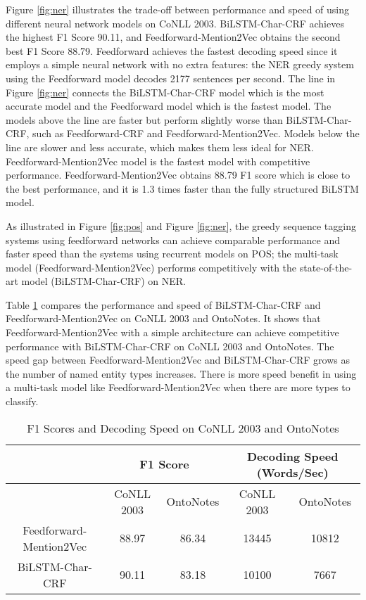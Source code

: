 Figure \ref{fig:ner} illustrates the trade-off between performance and speed of using different neural network models on CoNLL 2003. BiLSTM-Char-CRF achieves the highest F1 Score 90.11, and Feedforward-Mention2Vec obtains the second best F1 Score 88.79. Feedforward achieves the fastest decoding speed since it employs a simple neural network with no extra features: the NER greedy system using the Feedforward model decodes 2177 sentences per second. The line in Figure \ref{fig:ner} connects the BiLSTM-Char-CRF model which is the most accurate model and the Feedforward model which is the fastest model. The models above the line are faster but perform slightly worse than BiLSTM-Char-CRF, such as Feedforward-CRF and Feedforward-Mention2Vec. Models below the line are slower and less accurate, which makes them less ideal for NER. Feedforward-Mention2Vec model is the fastest model with competitive performance. Feedforward-Mention2Vec obtains 88.79 F1 score which is close to the best performance, and it is 1.3 times faster than the fully structured BiLSTM model.

As illustrated in Figure \ref{fig:pos} and Figure \ref{fig:ner}, the greedy sequence tagging systems using feedforward networks can achieve comparable performance and faster speed than the systems using recurrent models on POS; the multi-task model (Feedforward-Mention2Vec) performs competitively with the state-of-the-art model (BiLSTM-Char-CRF) on NER.

Table \ref{table:my-label3} compares the performance and speed of BiLSTM-Char-CRF and Feedforward-Mention2Vec on CoNLL 2003 and OntoNotes. It shows that Feedforward-Mention2Vec with a simple architecture can achieve competitive performance with BiLSTM-Char-CRF on CoNLL 2003 and OntoNotes. The speed gap between Feedforward-Mention2Vec and BiLSTM-Char-CRF grows as the number of named entity types increases. There is more speed benefit in using a multi-task model like Feedforward-Mention2Vec when there are more types to classify.

\begin{table}[]
\centering
\caption{F1 Scores and Decoding Speed on CoNLL 2003 and OntoNotes }
\label{table:my-label3}
\begin{tabular}{|c|c|c|c|c|}
\hline
& \multicolumn{2}{c|}{F1 Score} & \multicolumn{2}{c|}{Decoding Speed (Words/Sec)} \\ \hline
& CoNLL 2003     & OntoNotes    & CoNLL 2003              & OntoNotes             \\ \hline
Feedforward-Mention2Vec & 88.97          & 86.34        & 13445                   & 10812                 \\ \hline
BiLSTM-Char-CRF         & 90.11          & 83.18        & 10100                   & 7667                  \\ \hline
\end{tabular}
\end{table}

